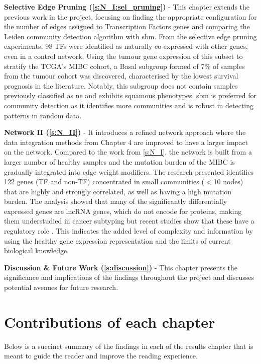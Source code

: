 \textbf{Selective Edge Pruning (\cref{s:N_I:sel_pruning})} - This chapter extends the previous work in the project, focusing on finding the appropriate configuration for the number of edges assigned to Transcription Factors genes and comparing the Leiden community detection algorithm with \acrfull{sbm}. From the selective edge pruning experiments, 98 TFs were identified as naturally co-expressed with other genes, even in a control network. Using the tumour gene expression of this subset to stratify the TCGA's MIBC cohort, a Basal subgroup formed of 7\% of samples from the tumour cohort was discovered, characterised by the lowest survival prognosis in the literature. Notably, this subgroup does not contain samples previously classified as \acrlong{ne} and exhibits squamous phenotypes. \acrshort{sbm} is preferred for community detection as it identifies more communities and is robust in detecting patterns in random data.


\textbf{Network II (\cref{s:N_II})} - It introduces a refined network approach where the data integration methods from Chapter 4 are improved to have a larger impact on the network. Compared to the work from \cref{s:N_I}, the network is built from a larger number of healthy samples and the mutation burden of the MIBC is gradually integrated into edge weight modifiers. The research presented identifies 122 genes (TF and non-TF) concentrated in small communities (\(<\)10 nodes) that are highly and strongly correlated, as well as having a high mutation burden. The analysis showed that many of the significantly differentially expressed genes are \acrlong{lncRNA} genes, which do not encode for proteins, making them understudied in cancer subtyping but recent studies show that these have a regulatory role \citep{Statello2021-md}. This indicates the added level of complexity and information by using the healthy gene expression representation and the limits of current biological knowledge.


\textbf{Discussion \& Future Work (\cref{s:discussion})} - This chapter presents the significance and implications of the findings throughout the project and discusses potential avenues for future research.


\section{Contributions of each chapter}

Below is a succinct summary of the findings in each of the results chapter that is meant to guide the reader and improve the reading experience.

